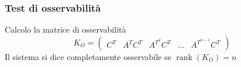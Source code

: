 	\subsubsection{Test di osservabilità}
	Calcolo la matrice di osservabilità 
	\[K_O=\left(\begin{array}{lllll}
		C^T & A^TC^T & A^{T^2} C^T & \ldots & A^{T^{n-1}} C^T
	\end{array}\right)\]
	Il sistema si dice completamente osservabile se $ \operatorname{rank}(K_O) = n $\\
	\\

